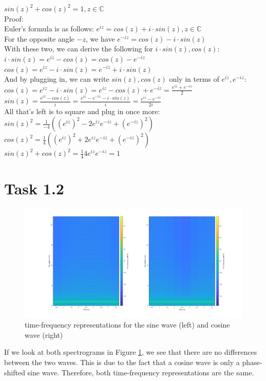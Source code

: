 \documentclass[12pt]{article}
\begin{document}
\begin{itemize}
$sin(z)^2 + cos(z)^2 = 1, z \in \mathbb{C}$\\
Proof:\\
Euler's formula is as follows: $e^{iz} = cos(z) + i \cdot sin(z), z \in \mathbb{C}$\\
For the opposite angle $-z$, we have $e^{-iz} = cos(z) - i \cdot sin(z)$\\
With these two, we can derive the following for $i \cdot sin(z), cos(z)$:\\
$i \cdot sin(z) = e^{iz} - cos(z) = cos(z) - e^{-iz}$\\
$cos(z) = e^{iz} - i \cdot sin(z) = e^{-iz} + i \cdot sin(z)$\\
And by plugging in, we can write $sin(z), cos(z)$ only in terms of $e^{iz}, e^{-iz}$:\\
$cos(z) = e^{iz} - i \cdot sin(z) = e^{iz} - cos(z) + e^{-iz} = \frac{e^{iz} + e^{-iz}}{2}$\\
$sin(z) = \frac{e^{iz} - cos(z)}{i} = \frac{e^{iz} - e^{-iz} - i \cdot sin(z)}{i} =\frac{e^{iz} - e^{-iz}}{2i}$\\
All that's left is to square and plug in once more:\\
$sin(z)^2 = \frac{1}{-4}((e^{iz})^{2} - 2e^{iz}e^{-iz} + (e^{-iz})^2)$\\
$cos(z)^2 = \frac{1}{4}((e^{iz})^{2} + 2e^{iz}e^{-iz} + (e^{-iz})^{2})$\\
$sin(z)^{2} + cos(z)^{2} = \frac{1}{4}4e^{iz}e^{-iz} = 1$\\

\end{itemize}
\section*{Task 1.2}
\begin{figure}[H]
    \centering
    \includegraphics[width=1.1\textwidth]{Spectrograms.png}
    \caption{time-frequency representations for the sine wave (left) and cosine wave (right)}
    \label{abb}
\end{figure}
If we look at both spectrograms in Figure \ref{abb}, we see that there are no differences between the two waves. This is due to the fact that a cosine wave is only a phase-shifted sine wave. Therefore, both time-frequency representations are the same.
\end{document}
